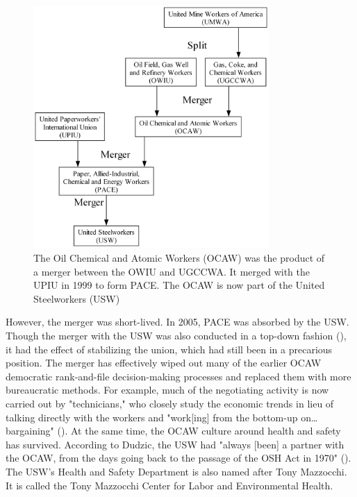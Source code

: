 \documentclass[12pt]{article}
\newcommand{\imageWidth}{0.8\textwidth}
\begin{document}
\begin{figure}[ht]
  \centering
  \includegraphics[width=\imageWidth]{images/ocaw}
  \captionsetup{justification=centering, singlelinecheck=false, margin=2cm} 
  \caption[Oil Chemical and Atomic Workers Mergers]{The Oil Chemical and Atomic Workers (OCAW) was the product of a merger between the OWIU and UGCCWA. It merged with the UPIU in 1999 to form PACE. The OCAW is now part of the United Steelworkers (USW)}
  \label{fig:ocaw}
\end{figure}

However, the merger was short-lived. In 2005, PACE was absorbed by the USW. Though the merger with the USW was also conducted in a top-down fashion (\cite{dudzicInterview2024}), it had the effect of stabilizing the union, which had still been in a precarious position. The merger has effectively wiped out many of the earlier OCAW democratic rank-and-file decision-making processes and replaced them with more bureaucratic methods. For example, much of the negotiating activity is now carried out by "technicians," who closely study the economic trends in lieu of talking directly with the workers and "work[ing] from the bottom-up on…bargaining" (\cite{dudzicInterview2024}). At the same time, the OCAW culture around health and safety has survived. According to Dudzic, the USW had "always [been] a partner with the OCAW, from the days going back to the passage of the OSH Act in 1970" (\cite{dudzicInterview2024}). The USW’s Health and Safety Department is also named after Tony Mazzocchi. It is called the Tony Mazzocchi Center for Labor and Environmental Health.
\end{document}
